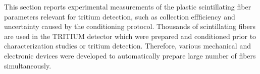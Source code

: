 This section reports experimental measurements of the plastic scintillating fiber parameters relevant for tritium detection, such as collection effficiency and uncertainty caused by the conditioning protocol. Thousands of scintillating fibers are used in the TRITIUM detector which were prepared and conditioned prior to characterization studies or tritium detection. Therefore, various mechanical and electronic devices were developed to automatically prepare large number of fibers simultaneously.